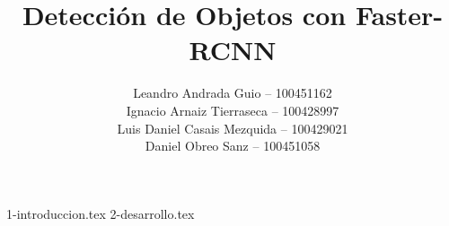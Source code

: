 \documentclass[es]{uc3mreport}
\author{
  Leandro Andrada Guio -- 100451162\\
  Ignacio Arnaiz Tierraseca -- 100428997\\
  Luis Daniel Casais Mezquida -- 100429021\\
  Daniel Obreo Sanz -- 100451058
}
\title{Detección de Objetos con Faster-RCNN}
\begin{document}
  \makecover[old]

  \begin{report}
    {1-introduccion.tex}
    {2-desarrollo.tex}
  \end{report}
\end{document}
